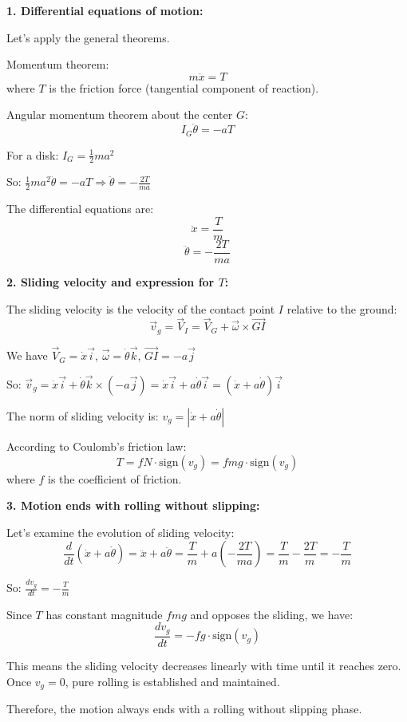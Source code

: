\documentclass[12pt]{article}
\begin{document}
\begin{correctionbox}
\textbf{1. Differential equations of motion:}

Let's apply the general theorems.

Momentum theorem:
$$m\ddot{x} = T$$
where $T$ is the friction force (tangential component of reaction).

Angular momentum theorem about the center $G$:
$$I_G\ddot{\theta} = -aT$$

For a disk: $I_G = \frac{1}{2}ma^2$

So: $\frac{1}{2}ma^2\ddot{\theta} = -aT \Rightarrow \ddot{\theta} = -\frac{2T}{ma}$

The differential equations are:
$$\ddot{x} = \frac{T}{m}$$
$$\ddot{\theta} = -\frac{2T}{ma}$$

\textbf{2. Sliding velocity and expression for $T$:}

The sliding velocity is the velocity of the contact point $I$ relative to the ground:
$$\vec{v}_g = \vec{V}_I = \vec{V}_G + \vec{\omega} \times \vec{GI}$$

We have $\vec{V}_G = \dot{x}\vec{i}$, $\vec{\omega} = \dot{\theta}\vec{k}$, $\vec{GI} = -a\vec{j}$

So: $\vec{v}_g = \dot{x}\vec{i} + \dot{\theta}\vec{k} \times (-a\vec{j}) = \dot{x}\vec{i} + a\dot{\theta}\vec{i} = (\dot{x} + a\dot{\theta})\vec{i}$

The norm of sliding velocity is: $v_g = |\dot{x} + a\dot{\theta}|$

According to Coulomb's friction law:
$$T = fN \cdot \text{sign}(v_g) = fmg \cdot \text{sign}(v_g)$$
where $f$ is the coefficient of friction.

\textbf{3. Motion ends with rolling without slipping:}

Let's examine the evolution of sliding velocity:
$$\frac{d}{dt}(\dot{x} + a\dot{\theta}) = \ddot{x} + a\ddot{\theta} = \frac{T}{m} + a\left(-\frac{2T}{ma}\right) = \frac{T}{m} - \frac{2T}{m} = -\frac{T}{m}$$

So: $\frac{dv_g}{dt} = -\frac{T}{m}$

Since $T$ has constant magnitude $fmg$ and opposes the sliding, we have:
$$\frac{dv_g}{dt} = -fg \cdot \text{sign}(v_g)$$

This means the sliding velocity decreases linearly with time until it reaches zero. Once $v_g = 0$, pure rolling is established and maintained.

Therefore, the motion always ends with a rolling without slipping phase.
\end{correctionbox}
\end{document}
